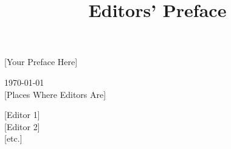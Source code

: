 \documentclass{dhbenelux}
\title{Editors' Preface}
\author{}
\begin{document}
\maketitle

\copyrightstatement
{}

\section*{}
[Your Preface Here]

\bigskip

\noindent
\begin{minipage}[t]{.4\textwidth}
\today\\ {[Places Where Editors Are]}
\end{minipage}%
\hfill
\begin{minipage}[t]{.4\textwidth}\flushright
{[Editor 1]} \\
{[Editor 2]} \\
{[etc.]}
\end{minipage}

\newpage\null\thispagestyle{empty}\newpage
\end{document}
